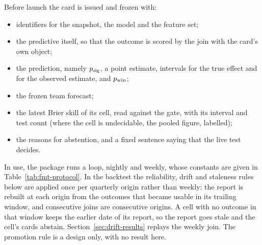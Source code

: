 Before launch the card is issued and frozen with:
\begin{itemize}
\item identifiers for the snapshot, the model and the feature set;
\item the predictive itself, so that the outcome is scored by the join with the card's own object;
\item the prediction, namely $p_{\mathrm{sig}}$, a point estimate, intervals for the true effect and for the observed estimate, and $p_{\mathrm{win}}$;
\item the frozen team forecast;
\item the latest Brier skill of its cell, read against the gate, with its interval and test count (where the cell is undecidable, the pooled figure, labelled);
\item the reasons for abstention, and a fixed sentence saying that the live test decides.
\end{itemize}
In use, the package runs a loop, nightly and weekly, whose constants are given in Table~\ref{tab:fmt-protocol}. In the backtest the reliability, drift and staleness rules below are applied once per quarterly origin rather than weekly: the report is rebuilt at each origin from the outcomes that became usable in its trailing window, and consecutive joins are consecutive origins. A cell with no outcome in that window keeps the earlier date of its report, so the report goes stale and the cell's cards abstain. Section~\ref{sec:drift-results} replays the weekly join. The promotion rule is a design only, with no result here.
